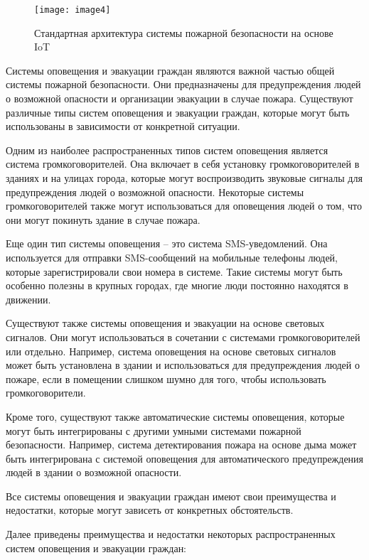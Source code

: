 \begin{figure}[H]
  \centering
  \texttt{[image: image4]}
  \caption{Стандартная архитектура системы пожарной безопасности на основе IoT}
\end{figure}

\begin{multicols}{2}

Системы оповещения и эвакуации граждан являются важной частью общей
системы пожарной безопасности. Они предназначены для предупреждения
людей о возможной опасности и организации эвакуации в случае пожара.
Существуют различные типы систем оповещения и эвакуации граждан, которые
могут быть использованы в зависимости от конкретной ситуации.

Одним из наиболее распространенных типов систем оповещения является
система громкоговорителей. Она включает в себя установку
громкоговорителей в зданиях и на улицах города, которые могут
воспроизводить звуковые сигналы для предупреждения людей о возможной
опасности. Некоторые системы громкоговорителей также могут
использоваться для оповещения людей о том, что они могут покинуть здание
в случае пожара.

Еще один тип системы оповещения -- это система SMS-уведомлений. Она
используется для отправки SMS-сообщений на мобильные телефоны людей,
которые зарегистрировали свои номера в системе. Такие системы могут быть
особенно полезны в крупных городах, где многие люди постоянно находятся
в движении.

Существуют также системы оповещения и эвакуации на основе световых
сигналов. Они могут использоваться в сочетании с системами
громкоговорителей или отдельно. Например, система оповещения на основе
световых сигналов может быть установлена в здании и использоваться для
предупреждения людей о пожаре, если в помещении слишком шумно для того,
чтобы использовать громкоговорители.

Кроме того, существуют также автоматические системы оповещения, которые
могут быть интегрированы с другими умными системами пожарной
безопасности. Например, система детектирования пожара на основе дыма
может быть интегрирована с системой оповещения для автоматического
предупреждения людей в здании о возможной опасности.

Все системы оповещения и эвакуации граждан имеют свои преимущества и
недостатки, которые могут зависеть от конкретных обстоятельств.

Далее приведены преимущества и недостатки некоторых распространенных
систем оповещения и эвакуации граждан:


\end{multicols}
